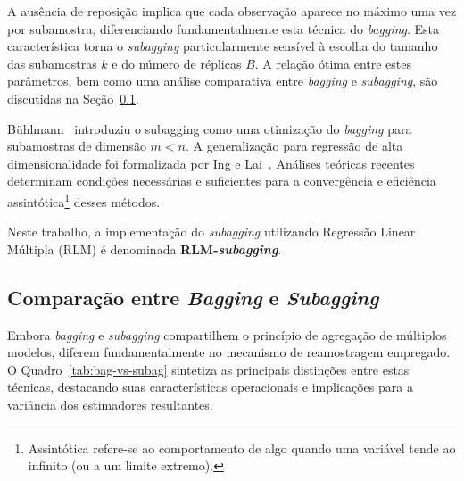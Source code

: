 A ausência de reposição implica que cada observação aparece no máximo uma vez por subamostra, diferenciando fundamentalmente esta técnica do \textit{bagging}. Esta característica torna o \textit{subagging} particularmente sensível à escolha do tamanho das subamostras $k$ e do número de réplicas $B$. A relação ótima entre estes parâmetros, bem como uma análise comparativa entre \textit{bagging} e \textit{subagging}, são discutidas na Seção~\ref{sec:bagxsuagg}.

Bühlmann~\cite{Buhlmann2003} introduziu o subagging como uma otimização do \textit{bagging} para
subamostras de dimensão $m < n$. A generalização para regressão de alta dimensionalidade foi 
formalizada por Ing e Lai~\cite{Ing2016}. Análises teóricas recentes~\cite{shi2021,revelas2024}
determinam condições necessárias e suficientes para a convergência e eficiência assintótica\footnote{Assintótica refere-se ao comportamento de algo quando uma variável tende ao infinito (ou a um limite extremo).} 
desses métodos.

Neste trabalho, a implementação do \textit{subagging} utilizando Regressão Linear Múltipla (RLM) é denominada \textbf{RLM-\textit{subagging}}.

\subsection{Comparação entre \textit{Bagging} e \textit{Subagging}}
\label{sec:bagxsuagg}

Embora \textit{bagging} e \textit{subagging} compartilhem o princípio de agregação de múltiplos modelos, diferem fundamentalmente no mecanismo de reamostragem empregado. O Quadro~\ref{tab:bag-vs-subag} sintetiza as principais distinções entre estas técnicas, destacando suas características operacionais e implicações para a variância dos estimadores resultantes.

